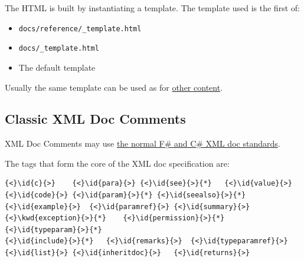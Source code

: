 \documentclass{article}
\newcommand{\id}[1]{\textcolor{black}{#1}}
\newcommand{\kwd}[1]{\textcolor{navy}{#1}}
\begin{document}
The HTML is built by instantiating a template. The template used is the first of:
\begin{itemize}
\item 

\texttt{docs/reference/\_template.html}

\item 

\texttt{docs/\_template.html}

\item 

The default template

\end{itemize}



Usually the same template can be used as for \href{content.html}{other content}.
\subsection*{Classic XML Doc Comments}



XML Doc Comments may use \href{https://docs.microsoft.com/en-us/dotnet/csharp/programming-guide/xmldoc/}{the normal F\# and C\# XML doc standards}.


The tags that form the core of the XML doc specification are:
\begin{Verbatim}[commandchars=\\\{\}]
{<}\id{c}{>}	{<}\id{para}{>}	{<}\id{see}{>}{*}	{<}\id{value}{>}
{<}\id{code}{>}	{<}\id{param}{>}{*}	{<}\id{seealso}{>}{*}	
{<}\id{example}{>}	{<}\id{paramref}{>}	{<}\id{summary}{>}	
{<}\kwd{exception}{>}{*}	{<}\id{permission}{>}{*}	{<}\id{typeparam}{>}{*}	
{<}\id{include}{>}{*}	{<}\id{remarks}{>}	{<}\id{typeparamref}{>}	
{<}\id{list}{>}	{<}\id{inheritdoc}{>}	{<}\id{returns}{>}	

\end{Verbatim}
\end{document}
